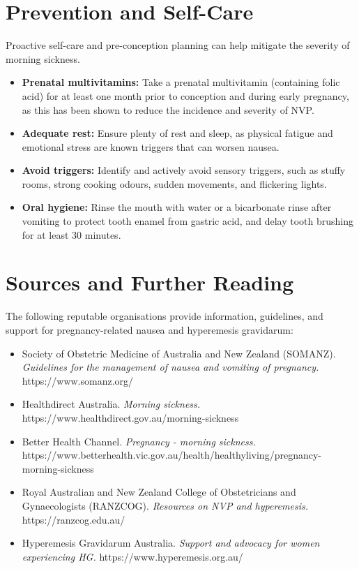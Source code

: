 \section*{Prevention and Self-Care}
Proactive self-care and pre-conception planning can help mitigate the severity of morning sickness.
\begin{itemize}
    \item \textbf{Prenatal multivitamins:} Take a prenatal multivitamin (containing folic acid) for at least one month prior to conception and during early pregnancy, as this has been shown to reduce the incidence and severity of NVP.
    \item \textbf{Adequate rest:} Ensure plenty of rest and sleep, as physical fatigue and emotional stress are known triggers that can worsen nausea.
    \item \textbf{Avoid triggers:} Identify and actively avoid sensory triggers, such as stuffy rooms, strong cooking odours, sudden movements, and flickering lights.
    \item \textbf{Oral hygiene:} Rinse the mouth with water or a bicarbonate rinse after vomiting to protect tooth enamel from gastric acid, and delay tooth brushing for at least 30 minutes.
\end{itemize}

\section*{Sources and Further Reading}
The following reputable organisations provide information, guidelines, and support for pregnancy-related nausea and hyperemesis gravidarum:
\begin{itemize}
    \item Society of Obstetric Medicine of Australia and New Zealand (SOMANZ). \textit{Guidelines for the management of nausea and vomiting of pregnancy.} https://www.somanz.org/
    \item Healthdirect Australia. \textit{Morning sickness.} https://www.healthdirect.gov.au/morning-sickness
    \item Better Health Channel. \textit{Pregnancy - morning sickness.} https://www.betterhealth.vic.gov.au/health/healthyliving/pregnancy-morning-sickness
    \item Royal Australian and New Zealand College of Obstetricians and Gynaecologists (RANZCOG). \textit{Resources on NVP and hyperemesis.} https://ranzcog.edu.au/
    \item Hyperemesis Gravidarum Australia. \textit{Support and advocacy for women experiencing HG.} https://www.hyperemesis.org.au/
\end{itemize}
